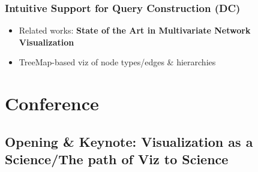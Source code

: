 \documentclass[a4paper]{article}
\begin{document}
\subsubsection{Intuitive Support for Query Construction (DC)}
\begin{itemize}
    \item Related works: \textbf{State of the Art
              in Multivariate Network Visualization}
    \item TreeMap-based viz of node types/edges \& hierarchies
\end{itemize}

\section{Conference}

\subsection{Opening  \& Keynote: Visualization as a Science/The path of Viz to Science}
\end{document}
